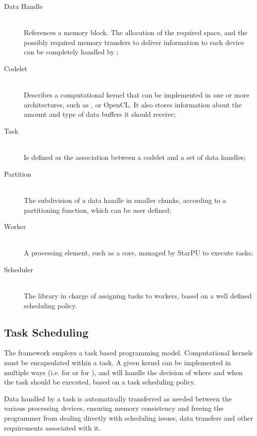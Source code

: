 \documentclass[main.tex]{subfiles}
\begin{document}
\begin{description}
  \item[Data Handle] \hfill \\
    References a memory block. The allocation of the required space, and the possibly required memory transfers to deliver information to each device can be completely handled by \starpu;

  \item[Codelet] \hfill \\
    Describes a computational kernel that can be implemented in one or more architectures, such as \cpus, \cuda or \acs{OpenCL}. It also stores information about the amount and type of data buffers it should receive;

  \item[Task] \hfill \\
    Is defined as the association between a codelet and a set of data handles;

  \item[Partition] \hfill \\
    The subdivision of a data handle in smaller chunks, according to a partitioning function, which can be user defined;

  \item[Worker] \hfill \\
    A processing element, such as a \cpu core, managed by StarPU to execute tasks;

  \item[Scheduler] \hfill \\
    The library in charge of assigning tasks to workers, based on a well defined scheduling policy.

\end{description}

\subsection{Task Scheduling}

The framework employs a task based programming model. Computational kernels must be encapsulated within a task. A given kernel can be implemented in multiple ways (i.e. for \cpus or for \cuda), and \starpu will handle the decision of where and when the task should be executed, based on a task scheduling policy.

Data handled by a task is automatically transferred as needed between the various processing devices, ensuring memory consistency and freeing the programmer from dealing directly with scheduling issues, data transfers and other requirements associated with it.
\end{document}
